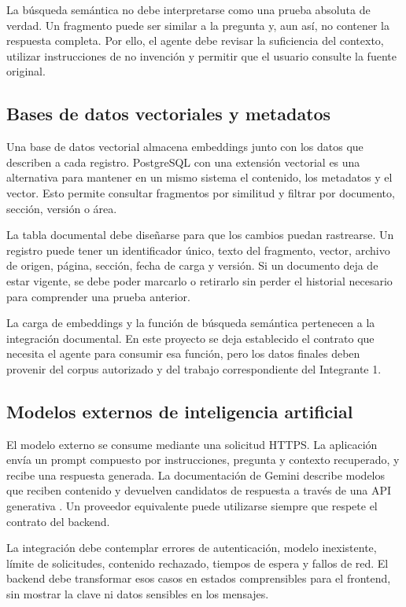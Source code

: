La búsqueda semántica no debe interpretarse como una prueba absoluta de verdad. Un fragmento puede ser similar a la pregunta y, aun así, no contener la respuesta completa. Por ello, el agente debe revisar la suficiencia del contexto, utilizar instrucciones de no invención y permitir que el usuario consulte la fuente original.

\subsection{Bases de datos vectoriales y metadatos}

Una base de datos vectorial almacena embeddings junto con los datos que describen a cada registro. PostgreSQL con una extensión vectorial es una alternativa para mantener en un mismo sistema el contenido, los metadatos y el vector. Esto permite consultar fragmentos por similitud y filtrar por documento, sección, versión o área.

La tabla documental debe diseñarse para que los cambios puedan rastrearse. Un registro puede tener un identificador único, texto del fragmento, vector, archivo de origen, página, sección, fecha de carga y versión. Si un documento deja de estar vigente, se debe poder marcarlo o retirarlo sin perder el historial necesario para comprender una prueba anterior.

La carga de embeddings y la función de búsqueda semántica pertenecen a la integración documental. En este proyecto se deja establecido el contrato que necesita el agente para consumir esa función, pero los datos finales deben provenir del corpus autorizado y del trabajo correspondiente del Integrante 1.

\subsection{Modelos externos de inteligencia artificial}

El modelo externo se consume mediante una solicitud HTTPS. La aplicación envía un prompt compuesto por instrucciones, pregunta y contexto recuperado, y recibe una respuesta generada. La documentación de Gemini describe modelos que reciben contenido y devuelven candidatos de respuesta a través de una API generativa \citep{googleGeminiApi}. Un proveedor equivalente puede utilizarse siempre que respete el contrato del backend.

La integración debe contemplar errores de autenticación, modelo inexistente, límite de solicitudes, contenido rechazado, tiempos de espera y fallos de red. El backend debe transformar esos casos en estados comprensibles para el frontend, sin mostrar la clave ni datos sensibles en los mensajes.


